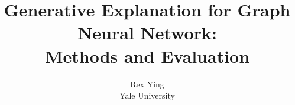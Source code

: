 \documentclass[11pt]{article}
\begin{document}
\title{Generative Explanation for Graph Neural Network: \\Methods and Evaluation}





\author{Rex Ying\\
Yale University}



\maketitle
\renewcommand\thesection{\arabic{section}}
\setcounter{section}{0}
\setcounter{figure}{0}
\setcounter{table}{0}






% 





{
\small


}



\end{document}
